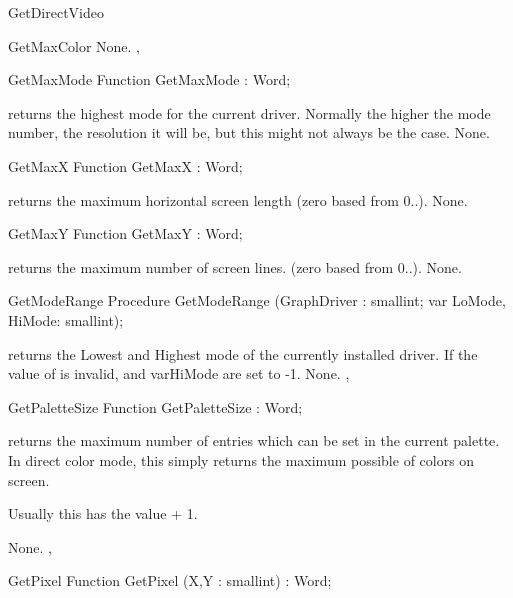 \begin{function}{GetDirectVideo}
\begin{function}{GetMaxColor}
\Errors
None.
\SeeAlso
{},
\end{function}
\begin{function}{GetMaxMode}
\Declaration
Function GetMaxMode  : Word;

\Description
{} returns the highest mode for the current driver. Normally
the higher the mode number, the resolution it will be, but this might not
always be the case.
\Errors
None.
\SeeAlso
{}
\end{function}

\begin{function}{GetMaxX}
\Declaration
Function GetMaxX  : Word;

\Description
{} returns the maximum horizontal screen
length (zero based from 0..).
\Errors
None.
\SeeAlso
{}
\end{function}
\begin{function}{GetMaxY}
\Declaration
Function GetMaxY  : Word;

\Description
{} returns the maximum number of screen
lines. (zero based from 0..).
\Errors
None.
\SeeAlso
{}
\end{function}

\begin{procedure}{GetModeRange}
\Declaration
Procedure GetModeRange (GraphDriver : smallint; var LoMode, HiMode: smallint);

\Description
{} returns the Lowest and Highest mode of the currently
installed driver. If the value of  is invalid, 
and var{HiMode} are set to -1.
\Errors
None.
\SeeAlso
{}, 
\end{procedure}
\begin{function}{GetPaletteSize}
\Declaration
Function GetPaletteSize  : Word;

\Description
{} returns the maximum number of entries which
can be set in the current palette. In direct color mode, this simply
returns the maximum possible of colors on screen.

Usually this has the value  + 1.

\Errors
None.
\SeeAlso
{},
\end{function}
\begin{function}{GetPixel}
\Declaration
Function GetPixel (X,Y : smallint) : Word;


\end{function}
\end{function}
